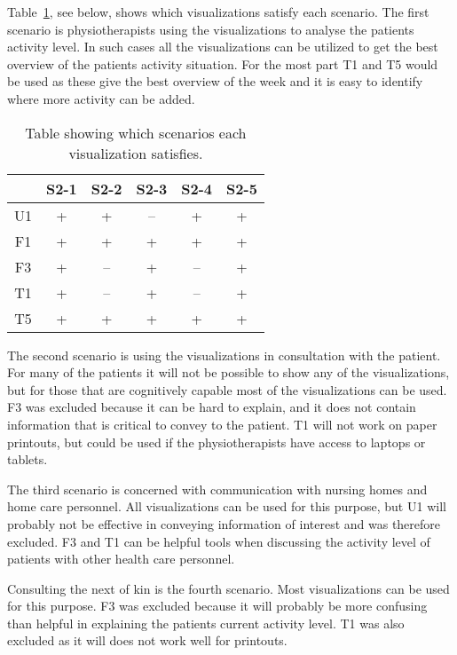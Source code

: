 Table~\ref{tab:scenSet}, see below, shows which visualizations satisfy each scenario. The first scenario is physiotherapists using the visualizations to analyse the patients activity level. In such cases all the visualizations can be utilized to get the best overview of the patients activity situation. For the most part T1 and T5 would be used as these give the best overview of the week and it is easy to identify where more activity can be added. 

\begin{table}[h!]
  \centering
  \begin{tabular}{|c|c|c|c|c|c|}
    \hline
       & S2-1 & S2-2 & S2-3 & S2-4 & S2-5 \\ \hline
    U1 & +  & +  & -- & +  & +  \\ \hline
    F1 & +  & +  & +  & +  & +  \\ \hline
    F3 & +  & -- & +  & -- & +  \\ \hline
    T1 & +  & -- & +  & -- & +  \\ \hline
    T5 & +  & +  & +  & +  & +  \\ \hline
  \end{tabular}
  \caption{Table showing which scenarios each visualization satisfies.}
  \label{tab:scenSet}
\end{table}

The second scenario is using the visualizations in consultation with the patient. For many of the patients it will not be possible to show any of the visualizations, but for those that are cognitively capable most of the visualizations can be used. F3 was excluded because it can be hard to explain, and it does not contain information that is critical to convey to the patient. T1 will not work on paper printouts, but could be used if the physiotherapists have access to laptops or tablets.

The third scenario is concerned with communication with nursing homes and home care personnel. All visualizations can be used for this purpose, but U1 will probably not be effective in conveying information of interest and was therefore excluded. F3 and T1 can be helpful tools when discussing the activity level of patients with other health care personnel.

Consulting the next of kin is the fourth scenario. Most visualizations can be used for this purpose. F3 was excluded because it will probably be more confusing than helpful in explaining the patients current activity level. T1 was also excluded as it will does not work well for printouts.

